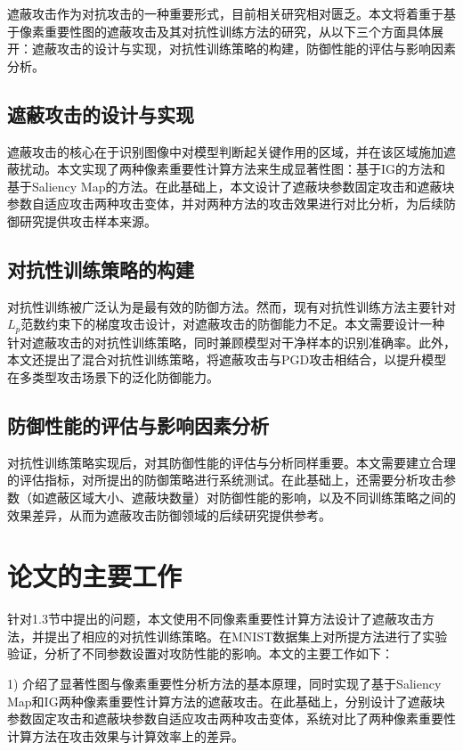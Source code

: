 遮蔽攻击作为对抗攻击的一种重要形式，目前相关研究相对匮乏。本文将着重于基于像素重要性图的遮蔽攻击及其对抗性训练方法的研究，从以下三个方面具体展开：遮蔽攻击的设计与实现，对抗性训练策略的构建，防御性能的评估与影响因素分析。

\subsection{遮蔽攻击的设计与实现}

遮蔽攻击的核心在于识别图像中对模型判断起关键作用的区域，并在该区域施加遮蔽扰动。本文实现了两种像素重要性计算方法来生成显著性图：基于IG的方法和基于Saliency Map的方法。在此基础上，本文设计了遮蔽块参数固定攻击和遮蔽块参数自适应攻击两种攻击变体，并对两种方法的攻击效果进行对比分析，为后续防御研究提供攻击样本来源。

\subsection{对抗性训练策略的构建}

对抗性训练被广泛认为是最有效的防御方法。然而，现有对抗性训练方法主要针对$L_p$范数约束下的梯度攻击设计，对遮蔽攻击的防御能力不足。本文需要设计一种针对遮蔽攻击的对抗性训练策略，同时兼顾模型对干净样本的识别准确率。此外，本文还提出了混合对抗性训练策略，将遮蔽攻击与PGD攻击相结合，以提升模型在多类型攻击场景下的泛化防御能力。

\subsection{防御性能的评估与影响因素分析}

对抗性训练策略实现后，对其防御性能的评估与分析同样重要。本文需要建立合理的评估指标，对所提出的防御策略进行系统测试。在此基础上，还需要分析攻击参数（如遮蔽区域大小、遮蔽块数量）对防御性能的影响，以及不同训练策略之间的效果差异，从而为遮蔽攻击防御领域的后续研究提供参考。


\section{论文的主要工作}

针对1.3节中提出的问题，本文使用不同像素重要性计算方法设计了遮蔽攻击方法，并提出了相应的对抗性训练策略。在MNIST数据集上对所提方法进行了实验验证，分析了不同参数设置对攻防性能的影响。本文的主要工作如下：

1) 介绍了显著性图与像素重要性分析方法的基本原理，同时实现了基于Saliency Map和IG两种像素重要性计算方法的遮蔽攻击。在此基础上，分别设计了遮蔽块参数固定攻击和遮蔽块参数自适应攻击两种攻击变体，系统对比了两种像素重要性计算方法在攻击效果与计算效率上的差异。

